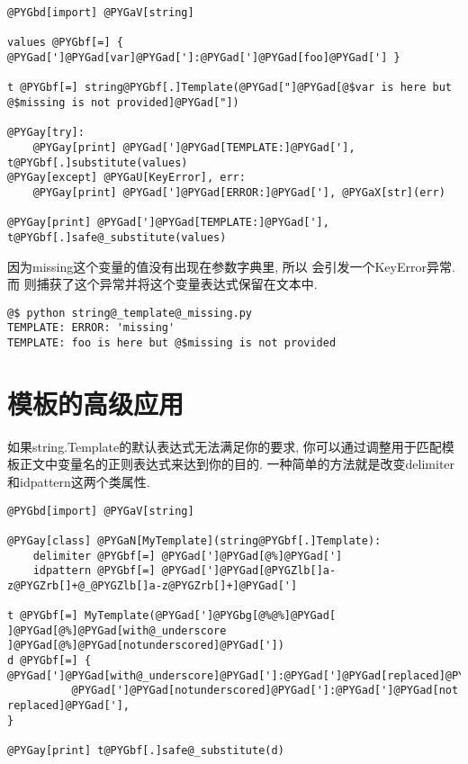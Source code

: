 \documentclass[a4paper,10pt,english]{manual}
\begin{document}
\begin{Verbatim}[commandchars=@\[\]]
@PYGbd[import] @PYGaV[string]

values @PYGbf[=] { @PYGad[']@PYGad[var]@PYGad[']:@PYGad[']@PYGad[foo]@PYGad['] }

t @PYGbf[=] string@PYGbf[.]Template(@PYGad["]@PYGad[@$var is here but @$missing is not provided]@PYGad["])

@PYGay[try]:
    @PYGay[print] @PYGad[']@PYGad[TEMPLATE:]@PYGad['], t@PYGbf[.]substitute(values)
@PYGay[except] @PYGaU[KeyError], err:
    @PYGay[print] @PYGad[']@PYGad[ERROR:]@PYGad['], @PYGaX[str](err)

@PYGay[print] @PYGad[']@PYGad[TEMPLATE:]@PYGad['], t@PYGbf[.]safe@_substitute(values)
\end{Verbatim}

因为missing这个变量的值没有出现在参数字典里, 所以  会引发一个KeyError异常. 而  则捕获了这个异常并将这个变量表达式保留在文本中.

\begin{Verbatim}[commandchars=@\[\]]
@$ python string@_template@_missing.py
TEMPLATE: ERROR: 'missing'
TEMPLATE: foo is here but @$missing is not provided
\end{Verbatim}


\section{模板的高级应用}

如果string.Template的默认表达式无法满足你的要求, 你可以通过调整用于匹配模板正文中变量名的正则表达式来达到你的目的. 一种简单的方法就是改变delimiter和idpattern这两个类属性.

\begin{Verbatim}[commandchars=@\[\]]
@PYGbd[import] @PYGaV[string]

@PYGay[class] @PYGaN[MyTemplate](string@PYGbf[.]Template):
    delimiter @PYGbf[=] @PYGad[']@PYGad[@%]@PYGad[']
    idpattern @PYGbf[=] @PYGad[']@PYGad[@PYGZlb[]a-z@PYGZrb[]+@_@PYGZlb[]a-z@PYGZrb[]+]@PYGad[']

t @PYGbf[=] MyTemplate(@PYGad[']@PYGbg[@%@%]@PYGad[ ]@PYGad[@%]@PYGad[with@_underscore ]@PYGad[@%]@PYGad[notunderscored]@PYGad['])
d @PYGbf[=] { @PYGad[']@PYGad[with@_underscore]@PYGad[']:@PYGad[']@PYGad[replaced]@PYGad['],
          @PYGad[']@PYGad[notunderscored]@PYGad[']:@PYGad[']@PYGad[not replaced]@PYGad['],
}

@PYGay[print] t@PYGbf[.]safe@_substitute(d)
\end{Verbatim}
\end{document}
